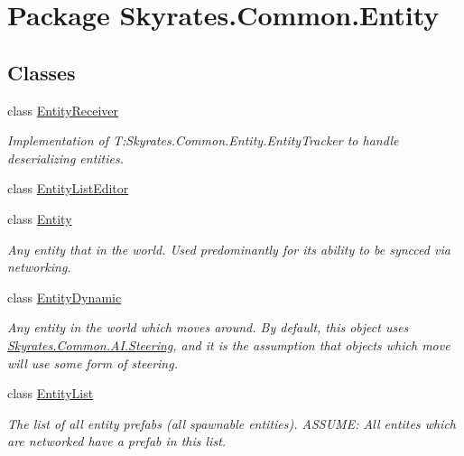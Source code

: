 \hypertarget{namespace_skyrates_1_1_common_1_1_entity}{\section{Package Skyrates.\-Common.\-Entity}
\label{namespace_skyrates_1_1_common_1_1_entity}
}
\subsection*{Classes}
\begin{DoxyCompactItemize}
\item 
class \hyperlink{class_skyrates_1_1_common_1_1_entity_1_1_entity_receiver}{Entity\-Receiver}
\begin{DoxyCompactList}\small\item\em Implementation of T\-:\-Skyrates.\-Common.\-Entity.\-Entity\-Tracker to handle deserializing entities. \end{DoxyCompactList}\item 
class \hyperlink{class_skyrates_1_1_common_1_1_entity_1_1_entity_list_editor}{Entity\-List\-Editor}
\item 
class \hyperlink{class_skyrates_1_1_common_1_1_entity_1_1_entity}{Entity}
\begin{DoxyCompactList}\small\item\em Any entity that in the world. Used predominantly for its ability to be syncced via networking. \end{DoxyCompactList}\item 
class \hyperlink{class_skyrates_1_1_common_1_1_entity_1_1_entity_dynamic}{Entity\-Dynamic}
\begin{DoxyCompactList}\small\item\em Any entity in the world which moves around. By default, this object uses \hyperlink{class_skyrates_1_1_common_1_1_a_i_1_1_steering}{Skyrates.\-Common.\-A\-I.\-Steering}, and it is the assumption that objects which move will use some form of steering. \end{DoxyCompactList}\item 
class \hyperlink{class_skyrates_1_1_common_1_1_entity_1_1_entity_list}{Entity\-List}
\begin{DoxyCompactList}\small\item\em The list of all entity prefabs (all spawnable entities). A\-S\-S\-U\-M\-E\-: All entites which are networked have a prefab in this list. \end{DoxyCompactList}\item 

\end{DoxyCompactItemize}
